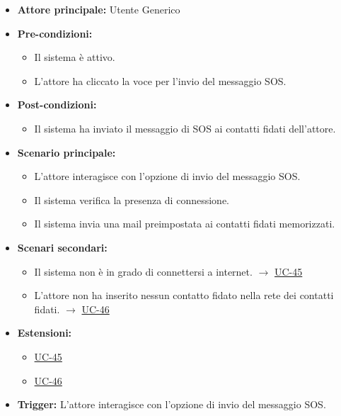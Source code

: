 \documentclass[a4paper,12pt]{article}
\newcommand{\ignoreglossary}{}
\begin{document}
\begin{itemize}
    \item \textbf{Attore principale:} Utente Generico
    \item \textbf{Pre-condizioni:} 
    \begin{itemize}
        \item Il sistema è attivo.
        \item L'attore ha cliccato la voce per l'invio del messaggio SOS.
    \end{itemize}
    \item \textbf{Post-condizioni:}
    \begin{itemize}
        \item Il sistema ha inviato il messaggio di SOS ai contatti fidati dell'attore.
    \end{itemize}
    \item \textbf{Scenario principale:} 
    \begin{itemize}
        \item L’attore interagisce con l'opzione di invio del messaggio SOS.
        \item Il sistema \ignoreglossary{verifica} la presenza di connessione.
	    \item Il sistema invia una mail preimpostata ai contatti fidati memorizzati.
    \end{itemize}
    \item \textbf{Scenari secondari:} 
    \begin{itemize}
        \item Il sistema non è in grado di connettersi a internet. $\rightarrow$ \hyperref[sec:UC-45]{UC-45}
        \item L'attore non ha inserito nessun contatto fidato nella rete dei contatti fidati. $\rightarrow$ \hyperref[sec:UC-46]{UC-46}
    \end{itemize}
    \item \textbf{Estensioni:}
    \begin{itemize}
        \item \hyperref[sec:UC-45]{UC-45}
        \item \hyperref[sec:UC-46]{UC-46}
    \end{itemize}
    \item \textbf{Trigger:} L'attore interagisce con l'opzione di invio del messaggio SOS.
\end{itemize}
\end{document}
